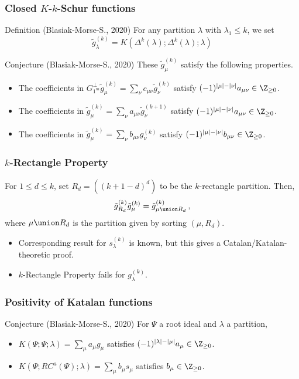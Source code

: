 \documentclass{beamer}
\begin{document}
\begin{frame}
  \frametitle{Closed \(K\)-\(k\)-Schur functions}
  \begin{block}{Definition (Blasiak-Morse-S., 2020)}
    For any partition \(\lambda\) with \(\lambda_1 \leq k\), we set \[
      \tilde{g}^{(k)}_\lambda = K(\Delta^k(\lambda);\Delta^k(\lambda);\lambda)
    \]
  \end{block}\pause
  \begin{block}{Conjecture (Blasiak-Morse-S., 2020)}
    These \(\tilde{g}^{(k)}_\mu\) satisfy the following properties. \pause
    \begin{itemize}
    \item The coefficients in \(G_{1^m}^\perp \tilde{g}_\mu^{(k)}
      = \sum_\nu c_{\mu \nu} \tilde{g}_\nu^{(k)}\) satisfy
      \((-1)^{|\mu|-|\nu|}a_{\mu \nu} \in \Z_{\geq 0}\).\pause
    \item The coefficients in \(\tilde{g}_\mu^{(k)} = \sum_\nu a_{\mu
        \nu} \tilde{g}_\nu^{(k+1)}\) satisfy \((-1)^{|\mu|-|\nu|}
      a_{\mu \nu} \in \Z_{\geq 0}\).\pause
    \item The coefficients in \(\tilde{g}_\mu^{(k)} = \sum_\nu b_{\mu
        \nu} g_\nu^{(k)}\) satisfy \((-1)^{|\mu|-|\nu|} b_{\mu\nu} \in
      \Z_{\geq 0}\).
    \end{itemize}
  \end{block}
\end{frame}
\begin{frame}
  \frametitle{\(k\)-Rectangle Property}
  \begin{theorem}[S. (thesis), 2021]
    For \(1 \leq d \leq k\), set \(R_d = ((k+1-d)^d)\) to be the
    \(k\)-rectangle partition. \pause Then,
    \[
      \tilde{g}_{R_d}^{(k)} \tilde{g}_\mu^{(k)} = \tilde{g}_{\mu
        \union R_d}^{(k)} \,,
    \] 
    where \(\mu \union R_d\) is the partition given by sorting \((\mu,R_d)\).\pause
  \end{theorem}
  \begin{itemize}
  \item Corresponding result for \(s_\lambda^{(k)}\) is known, but
    this gives a Catalan/Katalan-theoretic proof.\pause
  \item \(k\)-Rectangle Property fails for \(g_\lambda^{(k)}\).
  \end{itemize}
\end{frame}
\begin{frame}
  \frametitle{Positivity of Katalan functions}
  \begin{block}{Conjecture (Blasiak-Morse-S., 2020)}
    For \(\Psi\) a root ideal and \(\lambda\) a partition,\pause
    \begin{itemize}
    \item \(K(\Psi;\Psi;\lambda) = \sum_\mu a_{\mu}
      g_\mu\) satisfies \((-1)^{|\lambda|-|\mu|} a_{\mu} \in
      \Z_{\geq 0}\).\pause
    \item \(K(\Psi;RC^a(\Psi);\lambda) = \sum_\mu b_{\mu} s_\mu\)
      satisfies \(b_{\mu} \in \Z_{\geq 0}\).
    \end{itemize}
  \end{block}
\end{frame}
\end{document}
